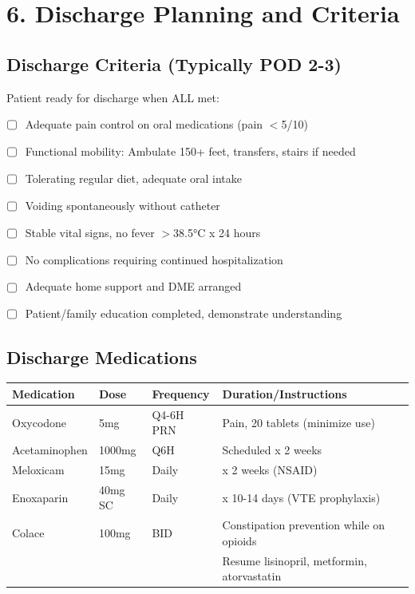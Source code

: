 \documentclass[11pt,letterpaper]{article}
\begin{document}
\section*{6. Discharge Planning and Criteria}

\subsection*{Discharge Criteria (Typically POD 2-3)}

Patient ready for discharge when ALL met:
\begin{itemize}[leftmargin=*]
    \item ☐ Adequate pain control on oral medications (pain $<$5/10)
    \item ☐ Functional mobility: Ambulate 150+ feet, transfers, stairs if needed
    \item ☐ Tolerating regular diet, adequate oral intake
    \item ☐ Voiding spontaneously without catheter
    \item ☐ Stable vital signs, no fever $>$38.5°C x 24 hours
    \item ☐ No complications requiring continued hospitalization
    \item ☐ Adequate home support and DME arranged
    \item ☐ Patient/family education completed, demonstrate understanding
\end{itemize}

\subsection*{Discharge Medications}

\begin{longtable}{|p{3cm}|p{2cm}|p{2cm}|p{6cm}|}
\hline
\textbf{Medication} & \textbf{Dose} & \textbf{Frequency} & \textbf{Duration/Instructions} \\ \hline
Oxycodone & 5mg & Q4-6H PRN & Pain, 20 tablets (minimize use) \\ \hline
Acetaminophen & 1000mg & Q6H & Scheduled x 2 weeks \\ \hline
Meloxicam & 15mg & Daily & x 2 weeks (NSAID) \\ \hline
Enoxaparin & 40mg SC & Daily & x 10-14 days (VTE prophylaxis) \\ \hline
Colace & 100mg & BID & Constipation prevention while on opioids \\ \hline
[Resume home meds] & & & Resume lisinopril, metformin, atorvastatin \\ \hline
\end{longtable}
\end{document}
